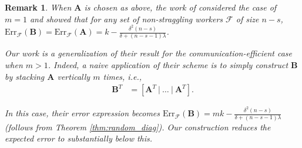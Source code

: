 \documentclass[journal,draftcls,onecolumn]{IEEEtran}
\theoremstyle{mystyle}
\newtheorem{remark}{Remark}
\newcommand{\bfA}{\mathbf{A}}
\newcommand{\bfB}{\mathbf{B}}
\newcommand{\aditya}[1]{\marginpar{+}{\bf Aditya's remark}: {\em #1}}
\begin{document}
\begin{remark} When $\mathbf{A}$ is chosen as above, the work of \cite{kadheKR19} considered the case of $m=1$ and showed that for any set of non-straggling workers $\mathcal{F}$ of size $n-s$, $\text{Err}_{\mathcal{F}}(\mathbf{B}) = \text{Err}_{\mathcal{F}}(\mathbf{A}) = k - \frac{\delta^2(n-s)}{\delta +  (n-s-1)\lambda}$.

Our work is a generalization of their result for the communication-efficient case when $m > 1$. Indeed, a naive application of their scheme is to simply construct $\mathbf{B}$ by stacking $\mathbf{A}$ vertically $m$ times, i.e., 
\begin{align}
  \bfB^T &= [ \bfA^T~|~ \dots ~|~ \bfA^T].  \label{eq:trivial_cons}
\end{align}
    


In this case, their error expression becomes $\text{Err}_{\mathcal{F}}(\mathbf{B}) = mk - \frac{\delta^2(n-s)}{\delta + (n-s-1)\lambda}$ (follows from Theorem \ref{thm:random_diag}).
Our construction reduces the expected error to substantially below this.
\end{remark}

\end{document}
